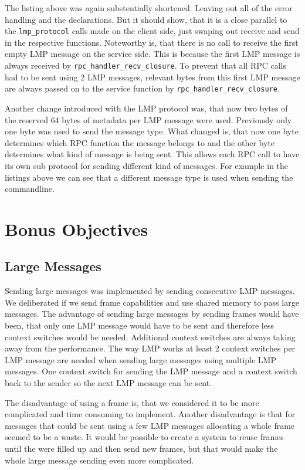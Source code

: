 The listing above was again substentially shortened. Leaving out all of the error handling and the declarations. But it should show, that it is a close parallel to the \verb|lmp_protocol| calls made on the client side, just swaping out receive and send in the respective functions.
Noteworthy is, that there is no call to receive the first empty LMP message on the service side. This is because the first LMP message is always received by \verb|rpc_handler_recv_closure|. To prevent that all RPC calls had to be sent using 2 LMP messages, relevant bytes from this first LMP message are always passed on to the service function by \verb|rpc_handler_recv_closure|.

Another change introduced with the LMP protocol was, that now two bytes of the reserved 64 bytes of metadata per LMP message were used. Previously only one byte was used to send the message type. What changed is, that now one byte determines which RPC function the message belongs to and the other byte determines what kind of message is being sent. This allows each RPC call to have its own sub protocol for sending different kind of messages. For example in the listings above we can see that a different message type is used when sending the commandline.

\section{Bonus Objectives}

\subsection{Large Messages}
Sending large messages was implemented by sending consecutive LMP messages. We deliberated if we send frame capabilities and use shared memory to pass large messages. The advantage of sending large messages by sending frames would have been, that only one LMP message would have to be sent and therefore less context switches would be needed. Additional context switches are always taking away from the performance. The way LMP works at least 2 context switches per LMP message are needed when sending large messages using multiple LMP messages. One context switch for sending the LMP message and a context switch back to the sender so the next LMP message can be sent.

The disadvantage of using a frame is, that we considered it to be more complicated and time consuming to implement. Another disadvantage is that for messages that could be sent using a few LMP messages allocating a whole frame seemed to be a waste. It would be possible to create a system to reuse frames until the were filled up and then send new frames, but that would make the whole large message sending even more complicated.

